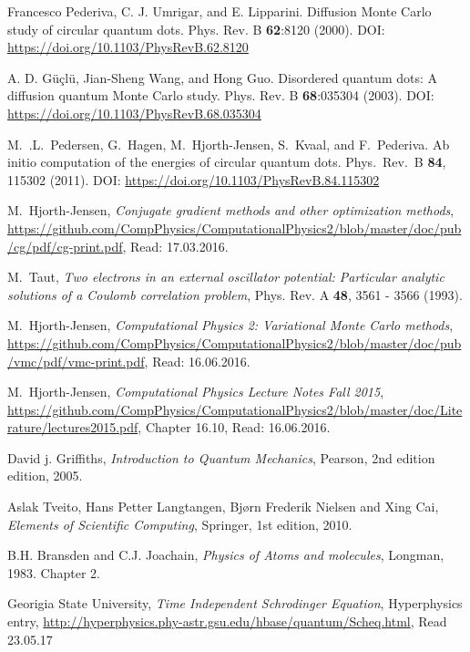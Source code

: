 \documentclass[../main.tex]{subfiles}
\begin{document}
\begin{thebibliography}{99}
 Francesco Pederiva, C. J. Umrigar, and E. Lipparini. Diffusion Monte Carlo study of
circular quantum dots. Phys. Rev. B \textbf{62}:8120 (2000). DOI: \url{https://doi.org/10.1103/PhysRevB.62.8120}

 A. D. Güçlü, Jian-Sheng Wang, and Hong Guo. Disordered quantum dots: A diffusion
quantum Monte Carlo study. Phys. Rev. B \textbf{68}:035304 (2003). DOI: \url{https://doi.org/10.1103/PhysRevB.68.035304}

 M.~.L.~Pedersen, G.~Hagen, M.~Hjorth-Jensen, S.~Kvaal,  and F.~Pederiva. Ab initio computation of the energies of circular quantum dots. Phys.~Rev.~B {\bf 84}, 115302 (2011). DOI: \url{https://doi.org/10.1103/PhysRevB.84.115302}

 M.~Hjorth-Jensen, {\em Conjugate gradient methods and other optimization methods},  \url{https://github.com/CompPhysics/ComputationalPhysics2/blob/master/doc/pub/cg/pdf/cg-print.pdf}, Read: 17.03.2016.

 M.~Taut, \emph{Two electrons in an external oscillator potential: Particular analytic solutions
of a Coulomb correlation problem}, Phys. Rev. A {\bf 48}, 3561 - 3566 (1993).

 M.~Hjorth-Jensen, \emph{Computational Physics 2: Variational Monte Carlo methods}, \url{https://github.com/CompPhysics/ComputationalPhysics2/blob/master/doc/pub/vmc/pdf/vmc-print.pdf}, Read: 16.06.2016.

 M.~Hjorth-Jensen, \emph{Computational Physics Lecture Notes Fall 2015},  \url{https://github.com/CompPhysics/ComputationalPhysics2/blob/master/doc/Literature/lectures2015.pdf}, Chapter 16.10, Read: 16.06.2016.

 David j. Griffiths, \emph{Introduction to Quantum Mechanics}, Pearson,
2nd edition edition, 2005.

 Aslak Tveito, Hans Petter Langtangen, Bjørn Frederik Nielsen and Xing Cai, \emph{Elements of Scientific Computing}, Springer, 1st edition, 2010.

 B.H. Bransden and C.J. Joachain, \emph{Physics of Atoms and molecules}, Longman, 1983. Chapter
2.

 Georigia State University, \emph{Time Independent Schrodinger Equation}, Hyperphysics entry, \url{http://hyperphysics.phy-astr.gsu.edu/hbase/quantum/Scheq.html}, Read 23.05.17


\end{thebibliography}
\end{document}
